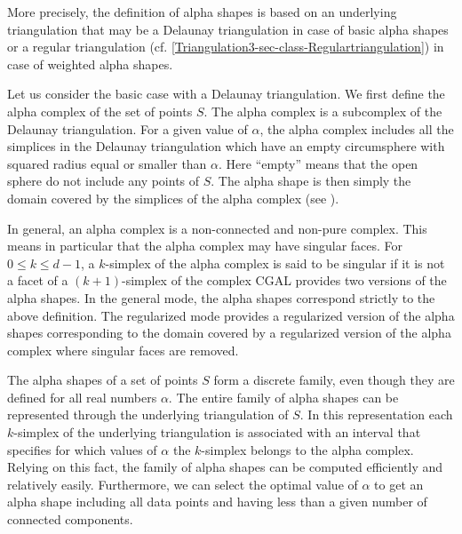 More precisely, the definition of alpha shapes is based on an underlying
triangulation that may be a Delaunay triangulation 
in case of basic alpha shapes 
or a regular triangulation 
(cf. \ref{Triangulation3-sec-class-Regulartriangulation})
in case of weighted alpha shapes.

Let us consider the basic case with a Delaunay triangulation.
We first define the alpha complex  of the set of points $S$. 
The  alpha complex is a subcomplex 
of the Delaunay triangulation.
For a given value of $\alpha$, the alpha complex includes
all the simplices in the Delaunay triangulation which have
an empty  circumsphere with squared radius equal or smaller than $\alpha$.
Here ``empty'' means  that the open sphere 
do not include  any points of $S$.
The alpha shape is then simply the domain covered by the simplices
of the alpha complex (see \cite{em-tdas-94}).

In general, an alpha complex is a non-connected and non-pure complex.
This means in particular that the alpha complex may have
singular faces.  For $0 \leq k \leq d-1$,
a $k$-simplex of the alpha complex  is said to be
singular if it is not a facet of a $(k+1)$-simplex of the complex
CGAL provides two versions of the alpha shapes. In the general mode,
the alpha shapes correspond strictly to the above definition.
The regularized mode provides a regularized version of the alpha shapes
corresponding to the domain covered by a regularized version
of the alpha complex where singular faces are removed.






The alpha shapes of a  set of points 
$S$ form a discrete family, even though they
are defined for all real numbers $\alpha$.
The entire family of alpha shapes can be represented 
through  the underlying triangulation of $S$. In this representation
each $k$-simplex of the underlying triangulation is associated with an
interval that specifies for which values of $\alpha$ the $k$-simplex
belongs to the alpha complex. Relying on this fact, the family of
 alpha shapes can be computed efficiently and relatively
easily. Furthermore, we can select the optimal value
of  $\alpha$ to get an alpha shape including all data points
and having   less than a given number of connected components.


